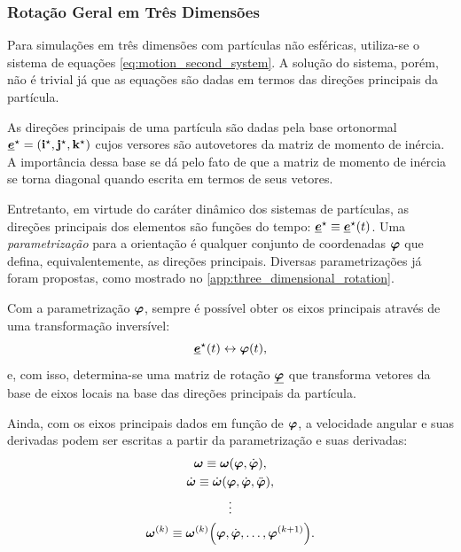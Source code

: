 \subsubsection{Rotação Geral em Três Dimensões} \label{subsubsec:general_rotation}

Para simulações em três dimensões com partículas não esféricas, utiliza-se o sistema de equações \eqref{eq:motion_second_system}. A solução do sistema, porém, não é trivial já que as equações são dadas em termos das direções principais da partícula.

As direções principais de uma partícula são dadas pela base ortonormal \(\principal{\basis} = \explicitVector{\principal{\xUnit}}{\principal{\yUnit}}{\principal{\zUnit}}\) cujos versores são autovetores da matriz de momento de inércia. A importância dessa base se dá pelo fato de que a matriz de momento de inércia se torna diagonal quando escrita em termos de seus vetores.

Entretanto, em virtude do caráter dinâmico dos sistemas de partículas, as direções principais dos elementos são funções do tempo: \(\principal{\basis} \equiv \principal{\basis}\pqty{t}\). Uma \textit{parametrização} para a orientação é qualquer conjunto de coordenadas \(\bm{\varphi}\) que defina, equivalentemente, as direções principais. Diversas parametrizações já foram propostas, como mostrado no \autoref{app:three_dimensional_rotation}.

Com a parametrização \(\bm{\varphi}\), sempre é possível obter os eixos principais através de uma transformação inversível:
\begin{equation*}
	\principal{\basis}\pqty{t} \leftrightarrow \orientation\pqty{t},
\end{equation*}
e, com isso, determina-se uma matriz de rotação \(\underline{\bm{\varphi}}\) que transforma vetores da base de eixos locais na base das direções principais da partícula.

Ainda, com os eixos principais dados em função de \(\bm{\varphi}\), a velocidade angular e suas derivadas podem ser escritas a partir da parametrização e suas derivadas:
\begin{gather*}
	\angularVelocity \equiv \angularVelocity\pqty{\orientation, \deriv{1}{\orientation}}, \\
	\deriv{1}{\angularVelocity} \equiv \deriv{1}{\angularVelocity}\pqty{\orientation, \deriv{1}{\orientation}, \deriv{2}{\orientation}}, \\
	\vdots \\
	\deriv{\taylorOrder}{\angularVelocity} \equiv \deriv{\taylorOrder}{\angularVelocity}\pqty{\orientation, \deriv{1}{\orientation}, \dots, \deriv{\taylorOrder+1}{\orientation}}.
\end{gather*}

